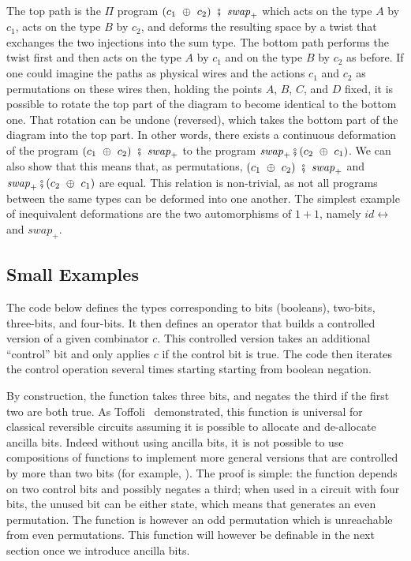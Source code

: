\documentclass[sigplan,10pt,review,anonymous]{acmart}
\newcommand{\swapp}{\mathit{swap}_+}
\newcommand{\idc}{\mathit{id}\!\!\leftrightarrow}
\begin{document}
\noindent The top path is the $\Pi$ program
$(c_1~\oplus~c_2)~\fatsemi~\swapp$ which acts on the type $A$ by $c_1$,
acts on the type $B$ by $c_2$, and deforms the resulting space by a
twist that exchanges the two injections into the sum type. The bottom
path performs the twist first and then acts on the type $A$ by $c_1$
and on the type $B$ by $c_2$ as before. If one could imagine the paths
as physical wires and the actions $c_1$ and $c_2$ as permutations on
these wires then, holding the points $A$, $B$, $C$, and $D$ fixed, it
is possible to rotate the top part of the diagram to become identical
to the bottom one. That rotation can be undone (reversed), which takes
the bottom part of the diagram into the top part.  In other words,
there exists a continuous deformation of the program
$(c_1~\oplus~c_2)~\fatsemi~\swapp$ to the program
$\swapp \fatsemi (c_2~\oplus~c_1)$. We can also show that this means
that, as permutations, $(c_1~\oplus~c_2)~\fatsemi~\swapp$ and
$\swapp \fatsemi (c_2~\oplus~c_1)$ are equal. This relation is
non-trivial, as not all programs between the same types can be
deformed into one another. The simplest example of inequivalent
deformations are the two automorphisms of $1+1$, namely $\idc$ and
$\swapp$.

\subsection{Small Examples}
 
The code below defines the types corresponding to bits (booleans),
two-bits, three-bits, and four-bits. It then defines an operator that
builds a controlled version of a given combinator $c$. This controlled
version takes an additional ``control'' bit and only applies $c$ if
the control bit is true. The code then iterates the control operation
several times starting starting from boolean negation.

\Bexamples{}

By construction, the  function takes three bits,
and negates the third if the first two are both true. As
Toffoli~\cite{Toffoli:1980} demonstrated, this function is universal
for classical reversible circuits assuming it is possible to allocate
and de-allocate ancilla bits. Indeed without using ancilla bits, it is
not possible to use compositions of  functions
to implement more general versions that are controlled by more than
two bits (for example, ). The proof is simple:
the  function depends on two control bits and
possibly negates a third; when used in a circuit with four bits, the
unused bit can be either state, which means that
 generates an even permutation. The function
 is however an odd permutation which is
unreachable from even permutations. This function will however be
definable in the next section once we introduce ancilla bits.
\end{document}
